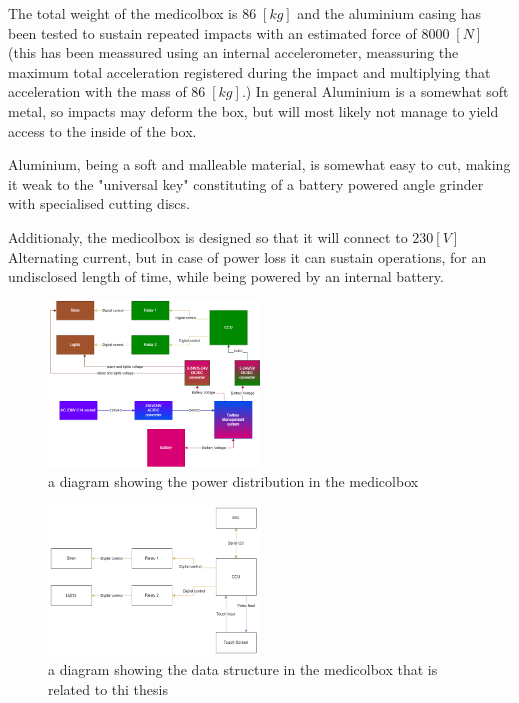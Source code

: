 \documentclass[../main.tex]{subfiles}
\begin{document}
The total weight of the \gls{medicolbox} is $86\;[kg]$ and the aluminium casing has been tested to sustain repeated impacts with an
estimated force of $8 000\;[N]$ (this has been meassured using an internal accelerometer,
meassuring the maximum total acceleration registered during the impact and multiplying that acceleration with the mass of $86\;[kg]$.)
In general Aluminium is a somewhat soft metal, so impacts may deform the box, but will most likely not manage to yield access to the inside of the box.

Aluminium, being a soft and malleable material, is somewhat easy to cut,
making it weak to the "universal key" constituting of
a battery powered angle grinder with specialised cutting discs.

Additionaly, the medicolbox is designed so that it will connect to $230 [V]$ Alternating current, but in case of power loss it can sustain operations, for an undisclosed length of time, while being powered by an internal battery.

\begin{figure}[htbp]
    \centering
    \includegraphics[width=0.5\textwidth]
    {resources/images/MediColBox-power-distribution.png}
    \caption{a diagram showing the power distribution in the \gls{medicolbox}}
    \label{fig:MediColBox-power-distribution}
\end{figure}

\begin{figure}[htbp]
    \centering
    \includegraphics[width=0.5\textwidth]
    {resources/images/MediColBox-related-data-diagram.png}
    \caption{a diagram showing the data structure in the \gls{medicolbox} that is related to thi thesis}
    \label{fig:MediColBox-related-data-diagram}
\end{figure}
\end{document}
